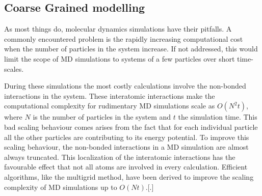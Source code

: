 %

\subsection{Coarse Grained modelling}
As most things do, molecular dynamics simulations have their pitfalls. A commonly
encountered problem is the rapidly increasing computational cost when the number of
particles in the system increase. If not addressed, this would limit the scope of MD
simulations to systems of a few particles over short time-scales.

During these simulations the most costly calculations involve the non-bonded
interactions in the system. These interatomic interactions make the computational
complexity for rudimentary MD simulations scale as $O(N^2t)$, where $N$ is the number of
particles in the system and $t$ the simulation time. This bad scaling behaviour comes
arises from the fact that for each individual particle all the other particles are
contributing to its energy potential. To improve this scaling behaviour, the non-bonded
interactions in a MD simulation are almost always truncated. This localization of the
interatomic interactions has the favourable effect that not all atoms are involved in
every calculation. Efficient algorithms, like the multigrid method, have been derived
to improve the scaling complexity of MD simulations up to $O(Nt)$.[.]


